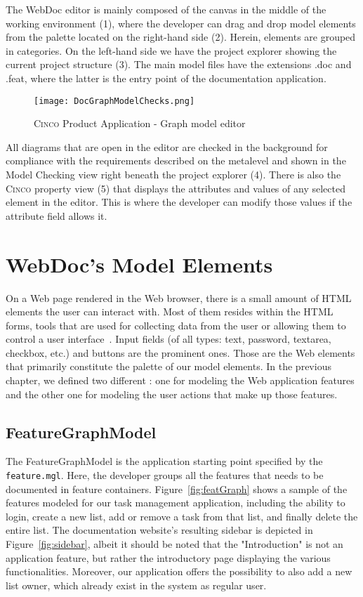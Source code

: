 The WebDoc editor is mainly composed of the canvas in the middle of the working environment (1), where the developer can drag and drop model elements from the palette located on the right-hand side (2). Herein, elements are grouped in categories. On the left-hand side we have the project explorer showing the current project structure (3). The main model files have the extensions .doc and .feat, where the latter is the entry point of the documentation application.

\begin{figure}[h]
    \centering
    \texttt{[image: DocGraphModelChecks.png]}
    \caption{\textsc{Cinco} Product Application - Graph model editor}\label{fig:graphDSL}
\end{figure}

All diagrams that are open in the editor are checked in the background for compliance with the requirements described on the metalevel and shown in the Model Checking view right beneath the project explorer (4). There is also the \textsc{Cinco} property view (5) that displays the attributes and values of any selected element in the editor. This is where the developer can modify those values if the attribute field allows it.

\section{WebDoc's Model Elements}\label{sec:WebDocModelElem}

On a Web page rendered in the Web browser, there is a small amount of HTML elements the user can interact with. Most of them resides within the HTML forms, tools that are used for collecting data from the user or allowing them to control a user interface~\cite{mozillaMDN}. Input fields (of all types: text, password, textarea, checkbox, etc.) and buttons are the prominent ones. Those are the Web elements that primarily constitute the palette of our model elements. In the previous chapter, we defined two different : one for modeling the Web application features and the other one for modeling the user actions that make up those features.

\subsection{FeatureGraphModel}\label{sec:FeaGrahptModElem}

The FeatureGraphModel is the application starting point specified by the \lstinline{feature.mgl}. Here, the developer groups all the features that needs to be documented in feature containers. Figure~\ref{fig:featGraph} shows a sample of the features modeled for our task management application, including the ability to login, create a new list, add or remove a task from that list, and finally delete the entire list. The documentation website's resulting sidebar is depicted in Figure~\ref{fig:sidebar}, albeit it should be noted that the "Introduction" is not an application feature, but rather the introductory page displaying the various functionalities. Moreover, our application offers the possibility to also add a new list owner, which already exist in the system as regular user.

